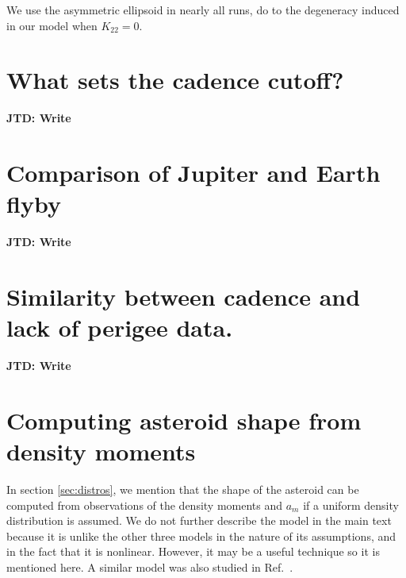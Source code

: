 \documentclass[fleqn,usenatbib]{mnras}
\newcommand{\jtd}[1]{ {\bf{\color{red} JTD: #1}} }
\begin{document}
We use the asymmetric ellipsoid in nearly all runs, do to the degeneracy induced in our model when $K_{22} = 0$.


\section{What sets the cadence cutoff?}
\label{app:cadence-tests}

\jtd{Write}



\section{Comparison of Jupiter and Earth flyby}
\label{app:jupiter-earth}

\jtd{Write}



\section{Similarity between cadence and lack of perigee data.}
\label{app:cadence-perigee-test}

\jtd{Write}



\section{Computing asteroid shape from density moments}
\label{app:find-surface}

In section \ref{sec:distros}, we mention that the shape of the asteroid can be computed from observations of the density moments and $a_m$ if a uniform density distribution is assumed. We do not further describe the model in the main text because it is unlike the other three models in the nature of its assumptions, and in the fact that it is nonlinear. However, it may be a useful technique so it is mentioned here. A similar model was also studied in Ref.~\cite{BAXANSKY2007756}.
\end{document}

